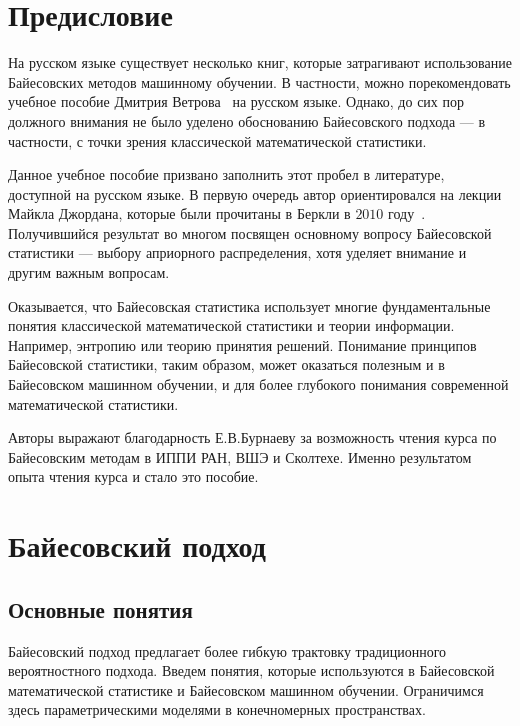 \section{Предисловие}

На русском языке существует несколько книг, 
которые затрагивают использование Байесовских методов машинному обучении.
В частности, можно порекомендовать учебное пособие Дмитрия Ветрова~\cite{vetrov2007bayesian} на русском языке.
Однако, до сих пор должного внимания не было уделено обоснованию Байесовского подхода --- в частности, 
с точки зрения классической математической статистики.

Данное учебное пособие призвано заполнить этот пробел в 
литературе, доступной на русском языке.
В первую очередь автор ориентировался на лекции Майкла Джордана, 
которые были прочитаны в Беркли в $2010$ году~\cite{jordan10notes}.
Получившийся результат во многом посвящен основному вопросу Байесовской статистики --- выбору априорного распределения,
хотя уделяет внимание и другим важным вопросам.

Оказывается, что Байесовская статистика использует 
многие фундаментальные понятия классической математической статистики и теории информации. 
Например, энтропию или теорию принятия решений.
Понимание принципов Байесовской статистики, таким образом, может оказаться полезным и в Байесовском машинном обучении, и для более глубокого понимания
современной математической статистики.

Авторы выражают благодарность Е.В.Бурнаеву за возможность чтения курса по Байесовским методам в ИППИ РАН, ВШЭ и Сколтехе.
Именно результатом опыта чтения курса и стало это пособие.

\section{Байесовский подход}

\subsection{Основные понятия}
Байесовский подход предлагает более гибкую трактовку традиционного вероятностного подхода.
Введем понятия, которые используются в Байесовской математической статистике и Байесовском машинном обучении.
Ограничимся здесь параметрическими моделями в конечномерных пространствах.

